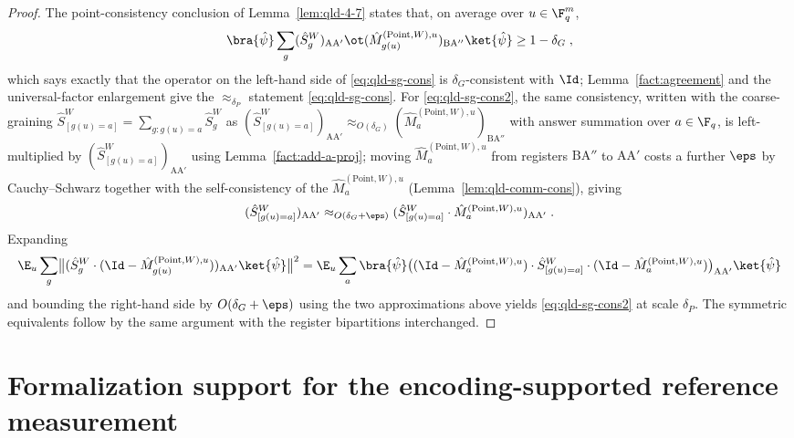 \begin{proof}
	\leanok
	The point-consistency conclusion of Lemma~\ref{lem:qld-4-7} states that, on average over $u \in \F_q^m$,
	\[
		\bra{\hat\psi} \sum_g (\hat{S}^W_g)_{\mathrm{A}\mathrm{A}'} \ot (\hat{M}^{(\mathrm{Point}, W), u}_{g(u)})_{\mathrm{B}\mathrm{A}''} \ket{\hat\psi} \geq 1 - \delta_G\;,
	\]
	which says exactly that the operator on the left-hand side of \eqref{eq:qld-sg-cons} is $\delta_G$-consistent with $\Id$; Lemma~\ref{fact:agreement} and the universal-factor enlargement give the $\approx_{\delta_P}$ statement \eqref{eq:qld-sg-cons}. For \eqref{eq:qld-sg-cons2}, the same consistency, written with the coarse-graining $\hat{S}^W_{[g(u)=a]} = \sum_{g : g(u) = a} \hat{S}^W_g$ as $(\hat{S}^W_{[g(u)=a]})_{\mathrm{A}\mathrm{A}'} \approx_{O(\delta_G)} (\hat{M}^{(\mathrm{Point}, W), u}_{a})_{\mathrm{B}\mathrm{A}''}$ with answer summation over $a \in \F_q$, is left-multiplied by $(\hat{S}^W_{[g(u)=a]})_{\mathrm{A}\mathrm{A}'}$ using Lemma~\ref{fact:add-a-proj}; moving $\hat{M}^{(\mathrm{Point}, W), u}_a$ from registers $\mathrm{B}\mathrm{A}''$ to $\mathrm{A}\mathrm{A}'$ costs a further $\eps$ by Cauchy--Schwarz together with the self-consistency of the $\hat{M}^{(\mathrm{Point}, W), u}_a$ (Lemma~\ref{lem:qld-comm-cons}), giving
	\[
		(\hat{S}^W_{[g(u)=a]})_{\mathrm{A}\mathrm{A}'} \approx_{O(\delta_G + \eps)} (\hat{S}^W_{[g(u)=a]} \cdot \hat{M}^{(\mathrm{Point}, W), u}_{a})_{\mathrm{A}\mathrm{A}'}\;.
	\]
	Expanding
	\[
		\E_u \sum_g \bigl\| (\hat{S}^W_{g} \cdot (\Id - \hat{M}^{(\mathrm{Point}, W), u}_{g(u)}))_{\mathrm{A}\mathrm{A}'} \ket{\hat\psi} \bigr\|^2
		= \E_u \sum_a \bra{\hat\psi} \bigl((\Id - \hat{M}^{(\mathrm{Point}, W), u}_{a}) \cdot \hat{S}^W_{[g(u)=a]} \cdot (\Id - \hat{M}^{(\mathrm{Point}, W), u}_{a})\bigr)_{\mathrm{A}\mathrm{A}'} \ket{\hat\psi}
	\]
	and bounding the right-hand side by $O(\delta_G + \eps)$ using the two approximations above yields \eqref{eq:qld-sg-cons2} at scale $\delta_P$. The symmetric equivalents follow by the same argument with the register bipartitions interchanged.
\end{proof}

	\section{Formalization support for the encoding-supported reference measurement}


